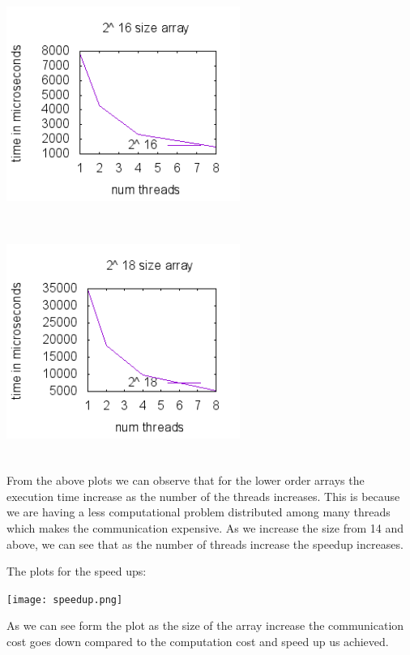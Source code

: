 \documentclass{article} %
\begin{document}
\noindent \includegraphics*[scale = 0.5, bb=0 0 3in 3in, width=3in, height=3in, keepaspectratio=true]{out16.png}\includegraphics*[scale = 0.5, bb=0 0 3in 3in, width=3in, height=3in, keepaspectratio=true]{out18.png}

\noindent 

\noindent From the above plots we can observe that for the lower order arrays the execution time increase as the number of the threads increases. This is because we are having a less computational problem distributed among many threads which makes the communication expensive. As we increase the size from 14 and above, we can see that as the number of threads increase the speedup increases.

\noindent 

\noindent 

\noindent 

\noindent The plots for the speed ups:

\noindent \texttt{[image: speedup.png]}

\noindent 

\noindent As we can see form the plot as the size of the array increase the communication cost goes down compared to the computation cost and speed up us achieved.

\noindent 
\end{document}
